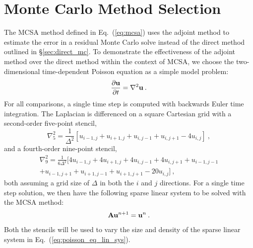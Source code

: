 \section{Monte Carlo Method Selection}
The MCSA method defined in Eq.~(\ref{eq:mcsa}) uses the adjoint method
to estimate the error in a residual Monte Carlo solve instead of the
direct method outlined in \S\ref{sec:direct_mc}. To demonstrate the
effectiveness of the adjoint method over the direct method within the
context of MCSA, we choose the two-dimensional time-dependent Poisson
equation as a simple model problem:
\begin{equation}
  \frac{\partial \mathbf{u}}{\partial t} = \nabla^2 \mathbf{u}\:.
  \label{eq:poisson_equation}
\end{equation}
For all comparisons, a single time step is computed with backwards Euler time
integration. The Laplacian is differenced on a square Cartesian grid with a
second-order five-point stencil,
\begin{equation}
  \nabla^2_5 = \frac{1}{\Delta^2}[u_{i-1,j} + u_{i+1,j} + u_{i,j-1} +
    u_{i,j+1} - 4 u_{i,j}]\:,
  \label{eq:five_point_stencil}
\end{equation}
and a fourth-order nine-point stencil,
\begin{multline}
  \nabla^2_9 = \frac{1}{6\Delta^2}[4 u_{i-1,j} + 4 u_{i+1,j} + 4
    u_{i,j-1} + 4 u_{i,j+1} + u_{i-1,j-1}\\ + u_{i-1,j+1} +
    u_{i+1,j-1} + u_{i+1,j+1} - 20 u_{i,j}]\:,
  \label{eq:nine_point_stencil}
\end{multline}
both assuming a grid size of $\Delta$ in both the $i$ and $j$ directions. For
a single time step solution, we then have the following sparse linear system
to be solved with the MCSA method:
\begin{equation}
  \mathbf{A} \mathbf{u}^{n+1} = \mathbf{u}^n\:.
  \label{eq:poisson_eq_lin_sys}
\end{equation}
Both the stencils will be used to vary the size and density of the sparse
linear system in Eq.~(\ref{eq:poisson_eq_lin_sys}).

